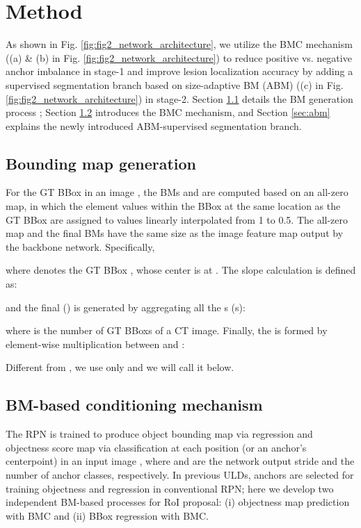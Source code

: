 \documentclass[runningheads]{llncs}
\begin{document}
\section{Method}
As shown in Fig. \ref{fig:fig2_network_architecture}, we utilize the BMC mechanism ((a) \& (b) in Fig. \ref{fig:fig2_network_architecture}) to reduce positive vs. negative anchor imbalance  in stage-1 and improve lesion localization accuracy by adding a supervised segmentation branch based on size-adaptive BM (ABM) ((c) in Fig. \ref{fig:fig2_network_architecture}) in stage-2. Section \ref{sec:bm} details the BM generation process \cite{li2020bounding}; Section \ref{sec:bmc} introduces the BMC mechanism, and Section \ref{sec:abm} explains the newly introduced ABM-supervised segmentation branch.


\subsection{Bounding map generation}\label{sec:bm}
For the  GT BBox in an image , the BMs  and  are computed based on an all-zero map, in which the element values within the BBox at the same location as the GT BBox are assigned to values linearly interpolated from 1 to 0.5. The all-zero map and the final BMs have the same size as the image feature map output by the backbone network.  Specifically,





where  denotes the  GT BBox , whose center is at . The slope  calculation is defined as:

and the final  () is generated by aggregating all the s (s):

 
where  is the number of GT BBoxs of a CT image. Finally, the  is  formed by  element-wise multiplication between  and \cite{li2020bounding}:

Different from \cite{li2020bounding}, we use only  and we will call it  below.
\subsection{BM-based conditioning mechanism} \label{sec:bmc}
The RPN is trained to produce object bounding map  via regression and objectness score map  via classification at each position (or an anchor's centerpoint) in an input image , where  and  are the network output stride and the number of anchor classes, respectively. In previous ULDs, anchors are selected for training objectness and regression in conventional RPN; here we develop two independent BM-based processes for RoI proposal: (i) objectness map prediction with BMC and (ii) BBox regression with BMC.
\end{document}
